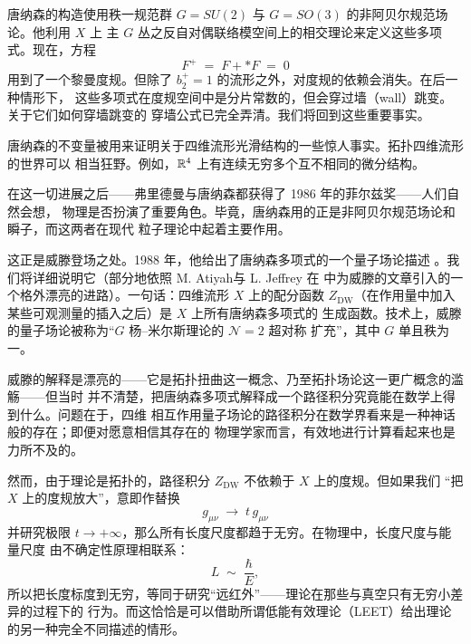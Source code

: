 唐纳森的构造使用秩一规范群 $G=SU(2)$ 与 $G=SO(3)$ 的非阿贝尔规范场论。他利用 $X$ 上
主 $G$ 丛之反自对偶联络模空间上的相交理论来定义这些多项式。现在，方程
\begin{equation}
  F^{+}\;=\;F+\ast F\;=\;0
  \tag{1.11}
\end{equation}
用到了一个黎曼度规。但除了 $b^{+}_{2}=1$ 的流形之外，对度规的依赖会消失。在后一种情形下，
这些多项式在度规空间中是分片常数的，但会穿过墙（wall）跳变。关于它们如何穿墙跳变的
穿墙公式已完全弄清。我们将回到这些重要事实。


唐纳森的不变量被用来证明关于四维流形光滑结构的一些惊人事实。拓扑四维流形的世界可以
相当狂野。例如，$\mathbb{R}^{4}$ 上有连续无穷多个互不相同的微分结构。

在这一切进展之后——弗里德曼与唐纳森都获得了 1986 年的菲尔兹奖——人们自然会想，
物理是否扮演了重要角色。毕竟，唐纳森用的正是非阿贝尔规范场论和瞬子，而这两者在现代
粒子理论中起着主要作用。

这正是威滕登场之处。1988 年，他给出了唐纳森多项式的一个量子场论描述
\cite{ref53}。我们将详细说明它（部分地依照 M. Atiyah与 L. Jeffrey 在 \cite{ref3}
中为威滕的文章引入的一个格外漂亮的进路）。一句话：四维流形 $X$ 上的配分函数
$Z_{\mathrm{DW}}$（在作用量中加入某些可观测量的插入之后）是 $X$ 上所有唐纳森多项式的
生成函数。技术上，威滕的量子场论被称为“$G$ 杨--米尔斯理论的 $\mathcal{N}=2$ 超对称
扩充”，其中 $G$ 单且秩为一。


威滕的解释是漂亮的——它是拓扑扭曲这一概念、乃至拓扑场论这一更广概念的滥觞——但当时
并不清楚，把唐纳森多项式解释成一个路径积分究竟能在数学上得到什么。问题在于，四维
相互作用量子场论的路径积分在数学界看来是一种神话般的存在；即便对愿意相信其存在的
物理学家而言，有效地进行计算看起来也是力所不及的。

然而，由于理论是拓扑的，路径积分 $Z_{\mathrm{DW}}$ 不依赖于 $X$ 上的度规。但如果我们
“把 $X$ 上的度规放大”，意即作替换
\begin{equation}
  g_{\mu\nu}\;\to\;t\,g_{\mu\nu}
  \tag{1.12}
\end{equation}
并研究极限 $t\to+\infty$，那么所有长度尺度都趋于无穷。在物理中，长度尺度与能量尺度
由不确定性原理相联系：
\begin{equation}
  L\;\sim\;\frac{\hbar}{E},
  \tag{1.13}
\end{equation}
所以把长度标度到无穷，等同于研究“远红外”——理论在那些与真空只有无穷小差异的过程下的
行为。而这恰恰是可以借助所谓低能有效理论（LEET）给出理论的另一种完全不同描述的情形。

